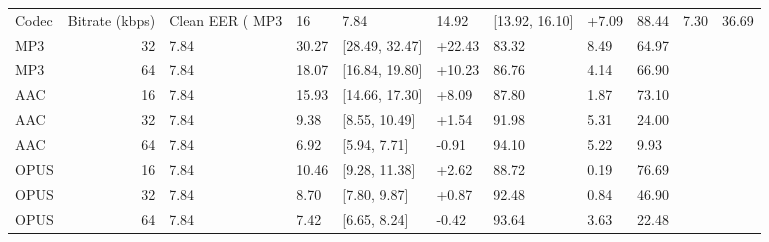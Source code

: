 \begin{tabular}{lrlllllll}
\toprule
Codec & Bitrate (kbps) & Clean EER (%
\midrule
MP3 & 16 & 7.84 & 14.92 & [13.92, 16.10] & +7.09 & 88.44 & 7.30 & 36.69 \\
MP3 & 32 & 7.84 & 30.27 & [28.49, 32.47] & +22.43 & 83.32 & 8.49 & 64.97 \\
MP3 & 64 & 7.84 & 18.07 & [16.84, 19.80] & +10.23 & 86.76 & 4.14 & 66.90 \\
AAC & 16 & 7.84 & 15.93 & [14.66, 17.30] & +8.09 & 87.80 & 1.87 & 73.10 \\
AAC & 32 & 7.84 & 9.38 & [8.55, 10.49] & +1.54 & 91.98 & 5.31 & 24.00 \\
AAC & 64 & 7.84 & 6.92 & [5.94, 7.71] & -0.91 & 94.10 & 5.22 & 9.93 \\
OPUS & 16 & 7.84 & 10.46 & [9.28, 11.38] & +2.62 & 88.72 & 0.19 & 76.69 \\
OPUS & 32 & 7.84 & 8.70 & [7.80, 9.87] & +0.87 & 92.48 & 0.84 & 46.90 \\
OPUS & 64 & 7.84 & 7.42 & [6.65, 8.24] & -0.42 & 93.64 & 3.63 & 22.48 \\
\bottomrule
\end{tabular}
